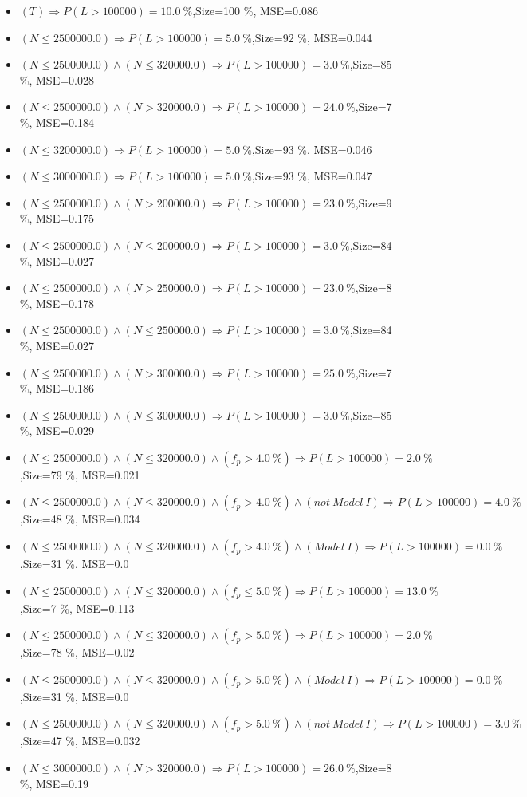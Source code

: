 \documentclass[numbered]{CSL}
\begin{document}
\begin{itemize}
\item $(T) \Rightarrow P(L > 100 000) = 10.0~\%$,\hfill Size=100 \%, MSE=0.086
\item $(N \leq 2500000.0) \Rightarrow P(L > 100 000) = 5.0~\%$,\hfill Size=92 \%, MSE=0.044
\item $(N \leq 2500000.0) \land (N \leq 320000.0) \Rightarrow P(L > 100 000) = 3.0~\%$,\hfill Size=85 \%, MSE=0.028
\item $(N \leq 2500000.0) \land (N > 320000.0) \Rightarrow P(L > 100 000) = 24.0~\%$,\hfill Size=7 \%, MSE=0.184
\item $(N \leq 3200000.0) \Rightarrow P(L > 100 000) = 5.0~\%$,\hfill Size=93 \%, MSE=0.046
\item $(N \leq 3000000.0) \Rightarrow P(L > 100 000) = 5.0~\%$,\hfill Size=93 \%, MSE=0.047
\item $(N \leq 2500000.0) \land (N > 200000.0) \Rightarrow P(L > 100 000) = 23.0~\%$,\hfill Size=9 \%, MSE=0.175
\item $(N \leq 2500000.0) \land (N \leq 200000.0) \Rightarrow P(L > 100 000) = 3.0~\%$,\hfill Size=84 \%, MSE=0.027
\item $(N \leq 2500000.0) \land (N > 250000.0) \Rightarrow P(L > 100 000) = 23.0~\%$,\hfill Size=8 \%, MSE=0.178
\item $(N \leq 2500000.0) \land (N \leq 250000.0) \Rightarrow P(L > 100 000) = 3.0~\%$,\hfill Size=84 \%, MSE=0.027
\item $(N \leq 2500000.0) \land (N > 300000.0) \Rightarrow P(L > 100 000) = 25.0~\%$,\hfill Size=7 \%, MSE=0.186
\item $(N \leq 2500000.0) \land (N \leq 300000.0) \Rightarrow P(L > 100 000) = 3.0~\%$,\hfill Size=85 \%, MSE=0.029
\item $(N \leq 2500000.0) \land (N \leq 320000.0) \land (f_p > 4.0~\%) \Rightarrow P(L > 100 000) = 2.0~\%$,\hfill Size=79 \%, MSE=0.021
\item $(N \leq 2500000.0) \land (N \leq 320000.0) \land (f_p > 4.0~\%) \land (not~Model~I) \Rightarrow P(L > 100 000) = 4.0~\%$,\hfill Size=48 \%, MSE=0.034
\item $(N \leq 2500000.0) \land (N \leq 320000.0) \land (f_p > 4.0~\%) \land (Model~I) \Rightarrow P(L > 100 000) = 0.0~\%$,\hfill Size=31 \%, MSE=0.0
\item $(N \leq 2500000.0) \land (N \leq 320000.0) \land (f_p \leq 5.0~\%) \Rightarrow P(L > 100 000) = 13.0~\%$,\hfill Size=7 \%, MSE=0.113
\item $(N \leq 2500000.0) \land (N \leq 320000.0) \land (f_p > 5.0~\%) \Rightarrow P(L > 100 000) = 2.0~\%$,\hfill Size=78 \%, MSE=0.02
\item $(N \leq 2500000.0) \land (N \leq 320000.0) \land (f_p > 5.0~\%) \land (Model~I) \Rightarrow P(L > 100 000) = 0.0~\%$,\hfill Size=31 \%, MSE=0.0
\item $(N \leq 2500000.0) \land (N \leq 320000.0) \land (f_p > 5.0~\%) \land (not~Model~I) \Rightarrow P(L > 100 000) = 3.0~\%$,\hfill Size=47 \%, MSE=0.032
\item $(N \leq 3000000.0) \land (N > 320000.0) \Rightarrow P(L > 100 000) = 26.0~\%$,\hfill Size=8 \%, MSE=0.19
\end{itemize}
\end{document}
